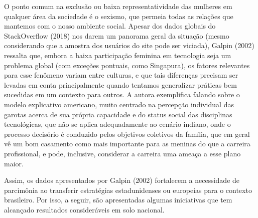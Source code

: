O ponto comum na exclusão ou baixa representatividade das mulheres em qualquer área da sociedade é o sexismo, que permeia todas as relações que mantemos com o nosso ambiente social. Apesar dos dados globais do StackOverflow (2018) nos darem um panorama geral da situação (mesmo considerando que a amostra dos usuários do site pode ser viciada), Galpin (2002) ressalta que, embora a baixa participação feminina em tecnologia seja um problema global (com exceções pontuais, como Singapura), os fatores relevantes para esse fenômeno variam entre culturas, e que tais diferenças precisam ser levadas em conta principalmente quando tentamos generalizar práticas bem sucedidas em um contexto para outros. A autora exemplifica falando sobre o modelo explicativo americano, muito centrado na percepção individual das garotas acerca de sua própria capacidade e do status social das disciplinas tecnológicas, que não se aplica adequadamente ao cenário indiano, onde o processo decisório é conduzido pelos objetivos coletivos da família, que em geral vê um bom casamento como mais importante para as meninas do que a carreira profissional, e pode, inclusive, considerar a carreira uma ameaça a esse plano maior.

Assim, os dados apresentados por Galpin (2002) fortalecem a necessidade de parcimônia ao transferir estratégias estadunidenses ou europeias para o contexto brasileiro. Por isso, a seguir, são apresentadas algumas iniciativas que tem alcançado resultados consideráveis em solo nacional.

